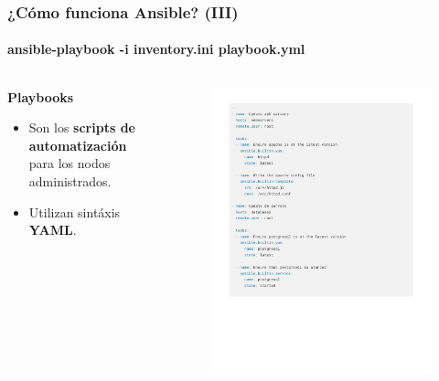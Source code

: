 \documentclass[
	11pt, %
]{beamer}
\begin{document}
\begin{frame}
	\frametitle{¿Cómo funciona Ansible? (III)}
	\framesubtitle{ansible-playbook -i inventory.ini playbook.yml}

	\begin{columns}[c]
		\begin{column}{0.45\textwidth}
			\textbf{Playbooks}
			\begin{itemize}
				\item Son los \textbf{scripts de automatización} para los nodos administrados.
				\item Utilizan sintáxis \textbf{YAML}.
			\end{itemize}
		\end{column}
		\begin{column}{0.5\textwidth}

			\begin{figure}
				\includegraphics[width=1.0\linewidth]{playbook.pdf}
			\end{figure}
		\end{column}
	\end{columns}
\end{frame}
\end{document}
